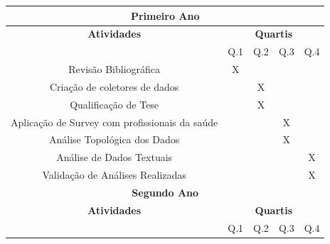 \documentclass[11pt, notitlepage]{article} %
\begin{document}
\begin{table}
  \centering
  \begin{tabular}{cllll}
  \hline
  \multicolumn{5}{|c|}{\cellcolor[HTML]{C0C0C0}\textbf{\large{Primeiro Ano}}} \\ \hline
  \multicolumn{1}{|c|}{\cellcolor[HTML]{C0C0C0}\textbf{Atividades}} & \multicolumn{4}{c|}{\cellcolor[HTML]{C0C0C0}\textbf{Quartis}} \\ \hline
  \multicolumn{1}{|c|}{} & \multicolumn{1}{c|}{Q.1} & \multicolumn{1}{c|}{Q.2} & \multicolumn{1}{c|}{Q.3} & \multicolumn{1}{c|}{Q.4} \\ \hline

  \multicolumn{1}{|c|}{Revisão Bibliográfica} & \multicolumn{1}{c|}{X} & \multicolumn{1}{c|}{} & \multicolumn{1}{c|}{} & \multicolumn{1}{c|}{} \\ \hline
  \multicolumn{1}{|c|}{Criação de coletores de dados} & \multicolumn{1}{c|}{} & \multicolumn{1}{c|}{X} & \multicolumn{1}{c|}{} & \multicolumn{1}{c|}{} \\ \hline
  \multicolumn{1}{|c|}{Qualificação de Tese} & \multicolumn{1}{c|}{} & \multicolumn{1}{c|}{X} & \multicolumn{1}{c|}{} & \multicolumn{1}{c|}{} \\ \hline
  \multicolumn{1}{|c|}{Aplicação de Survey com profissionais da saúde} & \multicolumn{1}{c|}{} & \multicolumn{1}{c|}{} & \multicolumn{1}{c|}{X} & \multicolumn{1}{c|}{} \\ \hline
  \multicolumn{1}{|c|}{Análise Topológica dos Dados} & \multicolumn{1}{c|}{} & \multicolumn{1}{c|}{} & \multicolumn{1}{c|}{X} & \multicolumn{1}{c|}{} \\ \hline
    \multicolumn{1}{|c|}{Análise de Dados Textuais} & \multicolumn{1}{c|}{} & \multicolumn{1}{c|}{} & \multicolumn{1}{c|}{} & \multicolumn{1}{c|}{X} \\ \hline
  \multicolumn{1}{|c|}{Validação de Análises Realizadas} & \multicolumn{1}{c|}{} & \multicolumn{1}{c|}{} & \multicolumn{1}{c|}{} & \multicolumn{1}{c|}{X} \\ \hline
  
  
  \multicolumn{5}{|c|}{\cellcolor[HTML]{C0C0C0}\textbf{\large{Segundo Ano}}} \\ \hline
  \multicolumn{1}{|c|}{\cellcolor[HTML]{C0C0C0}\textbf{Atividades}} & \multicolumn{4}{c|}{\cellcolor[HTML]{C0C0C0}\textbf{Quartis}} \\ \hline
  \multicolumn{1}{|c|}{} & \multicolumn{1}{c|}{Q.1} & \multicolumn{1}{c|}{Q.2} & \multicolumn{1}{c|}{Q.3} & \multicolumn{1}{c|}{Q.4} \\ \hline


\end{tabular}
\end{table}
\end{document}
